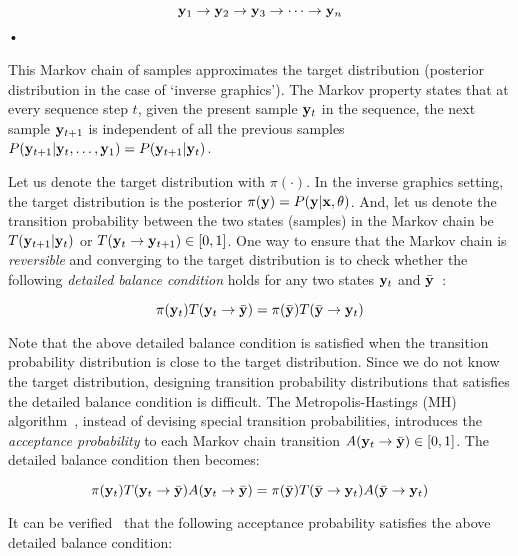 \begin{equation}
\mathbf{y}_1 \to \mathbf{y}_2 \to \mathbf{y}_3 \to \dots  \to \mathbf{y}_n
\end{equation}•

This Markov chain of samples approximates the target distribution (posterior
distribution in the case of `inverse graphics'). The Markov property states that
at every sequence step $t$, given the present sample $\mathbf{y}_t$ in the sequence,
the next sample $\mathbf{y}_{t+1}$ is independent of all the previous samples
$P(\mathbf{y}_{t+1}|\mathbf{y}_t,\dots,\mathbf{y}_1) = P(\mathbf{y}_{t+1}|\mathbf{y}_t)$.
%

Let us denote the target distribution with $\pi(\cdot)$. In the inverse
graphics setting, the target distribution is the posterior $\pi(\mathbf{y})=P(\mathbf{y} | \mathbf{x},\mathbf{\theta})$.
And, let us denote the transition probability between the two states (samples) in the
Markov chain be $T(\mathbf{y}_{t+1}|\mathbf{y}_{t})$ or $T(\mathbf{y}_t\to\mathbf{y}_{t+1}) \in [0,1]$. One way to ensure that the
Markov chain is \emph{reversible} and converging to the target distribution is to check whether the
following \emph{detailed balance condition} holds for any two states
$\mathbf{y}_t$ and $\bar{\mathbf{y}}$~\cite{koller2009probabilistic}:

\begin{equation}
\pi(\mathbf{y}_t) T(\mathbf{y}_t \to \bar{\mathbf{y}}) = \pi(\bar{\mathbf{y}}) T(\bar{\mathbf{y}} \to \mathbf{y}_t)
\end{equation}

Note that the above detailed balance condition is satisfied when the transition probability distribution is
close to the target distribution. Since we do not know the target distribution, designing
transition probability distributions that satisfies the detailed balance condition is difficult.
The Metropolis-Hastings (MH) algorithm~\cite{metropolis1953}, instead of devising special transition probabilities,
introduces the \emph{acceptance probability} to each Markov chain transition
$A(\mathbf{y}_t \to \bar{\mathbf{y}}) \in [0,1]$. The detailed balance condition then becomes:

\begin{equation}
\pi(\mathbf{y}_t) T(\mathbf{y}_t \to \bar{\mathbf{y}}) A(\mathbf{y}_t\to\bar{\mathbf{y}}) =
\pi(\bar{\mathbf{y}}) T(\bar{\mathbf{y}} \to \mathbf{y}_t) A(\bar{\mathbf{y}}\to\mathbf{y}_t)
\end{equation}

It can be verified~\cite{koller2009probabilistic} that the following acceptance
probability satisfies the above detailed balance condition:

